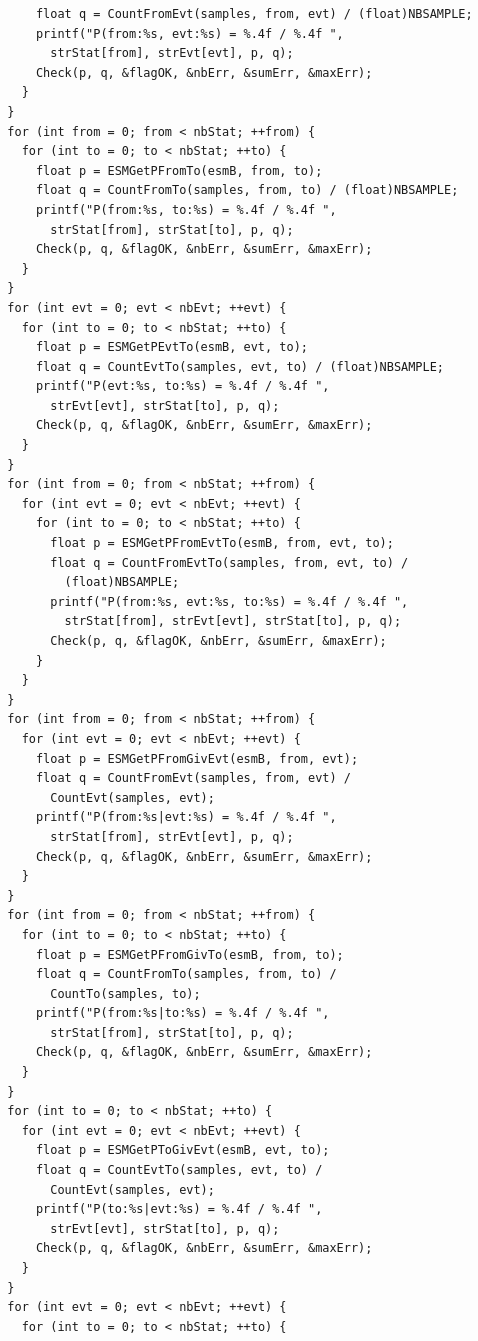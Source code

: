 \documentclass[12pt, a4paper]{article}
\begin{document}
\begin{scriptsize}
\begin{ttfamily}
\begin{lstlisting}
      float q = CountFromEvt(samples, from, evt) / (float)NBSAMPLE;
      printf("P(from:%s, evt:%s) = %.4f / %.4f ", 
        strStat[from], strEvt[evt], p, q);
      Check(p, q, &flagOK, &nbErr, &sumErr, &maxErr);
    }
  }
  for (int from = 0; from < nbStat; ++from) {
    for (int to = 0; to < nbStat; ++to) {
      float p = ESMGetPFromTo(esmB, from, to);
      float q = CountFromTo(samples, from, to) / (float)NBSAMPLE;
      printf("P(from:%s, to:%s) = %.4f / %.4f ", 
        strStat[from], strStat[to], p, q);
      Check(p, q, &flagOK, &nbErr, &sumErr, &maxErr);
    }
  }
  for (int evt = 0; evt < nbEvt; ++evt) {
    for (int to = 0; to < nbStat; ++to) {
      float p = ESMGetPEvtTo(esmB, evt, to);
      float q = CountEvtTo(samples, evt, to) / (float)NBSAMPLE;
      printf("P(evt:%s, to:%s) = %.4f / %.4f ", 
        strEvt[evt], strStat[to], p, q);
      Check(p, q, &flagOK, &nbErr, &sumErr, &maxErr);
    }
  }
  for (int from = 0; from < nbStat; ++from) {
    for (int evt = 0; evt < nbEvt; ++evt) {
      for (int to = 0; to < nbStat; ++to) {
        float p = ESMGetPFromEvtTo(esmB, from, evt, to);
        float q = CountFromEvtTo(samples, from, evt, to) / 
          (float)NBSAMPLE;
        printf("P(from:%s, evt:%s, to:%s) = %.4f / %.4f ", 
          strStat[from], strEvt[evt], strStat[to], p, q);
        Check(p, q, &flagOK, &nbErr, &sumErr, &maxErr);
      }
    }
  }
  for (int from = 0; from < nbStat; ++from) {
    for (int evt = 0; evt < nbEvt; ++evt) {
      float p = ESMGetPFromGivEvt(esmB, from, evt);
      float q = CountFromEvt(samples, from, evt) / 
        CountEvt(samples, evt);
      printf("P(from:%s|evt:%s) = %.4f / %.4f ", 
        strStat[from], strEvt[evt], p, q);
      Check(p, q, &flagOK, &nbErr, &sumErr, &maxErr);
    }
  }
  for (int from = 0; from < nbStat; ++from) {
    for (int to = 0; to < nbStat; ++to) {
      float p = ESMGetPFromGivTo(esmB, from, to);
      float q = CountFromTo(samples, from, to) / 
        CountTo(samples, to);
      printf("P(from:%s|to:%s) = %.4f / %.4f ", 
        strStat[from], strStat[to], p, q);
      Check(p, q, &flagOK, &nbErr, &sumErr, &maxErr);
    }
  }
  for (int to = 0; to < nbStat; ++to) {
    for (int evt = 0; evt < nbEvt; ++evt) {
      float p = ESMGetPToGivEvt(esmB, evt, to);
      float q = CountEvtTo(samples, evt, to) / 
        CountEvt(samples, evt);
      printf("P(to:%s|evt:%s) = %.4f / %.4f ", 
        strEvt[evt], strStat[to], p, q);
      Check(p, q, &flagOK, &nbErr, &sumErr, &maxErr);
    }
  }
  for (int evt = 0; evt < nbEvt; ++evt) {
    for (int to = 0; to < nbStat; ++to) {

\end{lstlisting}
\end{ttfamily}
\end{scriptsize}
\end{document}
